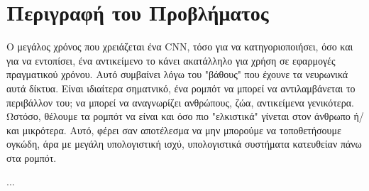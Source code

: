 \section{Περιγραφή του Προβλήματος}
\label{section:problem_description}

Ο μεγάλος χρόνος που χρειάζεται ένα CNN, τόσο για να κατηγοριοποιήσει, όσο και
για να εντοπίσει, ένα αντικείμενο το κάνει ακατάλληλο για χρήση σε εφαρμογές πραγματικού
χρόνου. Αυτό συμβαίνει λόγω του "βάθους" που έχουνε τα νευρωνικά αυτά δίκτυα.
Είναι ιδιαίτερα σηματνικό, ένα ρομπότ να μπορεί να αντιλαμβάνεται το περιβάλλον
του; να μπορεί να αναγνωρίζει ανθρώπους, ζώα, αντικείμενα γενικότερα. Ωστόσο,
θέλουμε τα ρομπότ να είναι και όσο πιο "ελκιστικά" γίνεται στον άνθρωπο ή/και μικρότερα.
Αυτό, φέρει σαν αποτέλεσμα να μην μπορούμε να τοποθετήσουμε ογκώδη, άρα με μεγάλη
υπολογιστική ισχύ, υπολογιστικά συστήματα κατευθείαν πάνω στα ρομπότ.

...
